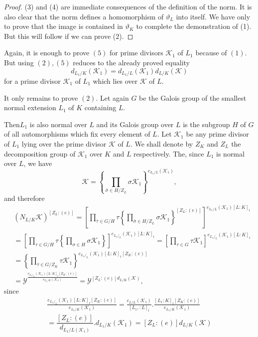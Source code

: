 \begin{proof}
  (3) and (4) are immediate consequences of the definition of the
  norm. It is also clear that the norm defines a homomorphism of
  $\vartheta_L$ into itself. We have only to prove that the image is
  contained in $\vartheta_K$ to complete the demonstration of
  (1). But this will follow if we can prove (2). 
\end{proof}

Again, it is enough to prove $(5)$ for prime divisors $\mathscr{K}_1$
of $L_1$ because of $(1)$. But using $(2), (5)$ reduces to the already
proved equality 
$$
d_{L_1 /K}(\mathscr{K}_1) = d_{L _1/ L}(\mathscr{K}_1) d_{L/ K}(\mathscr{K})
$$
for a prime divisor $\mathscr{K}_1$ of $L_1$ which lies over
$\mathscr{K}$ of $L$. 

It only remains to prove $(2)$. Let again $G$ be the Galois group of
the smallest normal extension $L_1$ of $K$ containing $L$. 

Then\pageoriginale $L_1$ is also normal over $L$ and its Galois group over $L$ is
the subgroup $H$ of $G$ of all automorphisms which fix every element
of $L$. Let $\mathscr{K}_1$ be any prime divisor of $L_1$ lying over
the prime divisor $\mathscr{K}$ of $L$. We shall denote by $Z_K$ and
$Z_L$ the decomposition group of $\mathscr{K}_1$ over $K$ and $L$
respectively. The, since $L_1$ is normal over $L$, we have  
$$
  \mathscr{K}= \left\{ \prod_{\bar{\sigma }\in H/ Z_L} \sigma
  \mathscr{K}_1\right\}^{e_{L_1 /L}(\mathscr{K}_1)},
$$
and therefore
\begin{align*} 
  & (N_{L /K}\mathscr{K})^{[Z_L : (e)]}= \left[ \prod_{\bar{\tau} \in G/
      H} \tau \left\{ \prod_{\bar{\sigma} \in  H/Z_L}\sigma
    \mathscr{K}_1\right\}^{[Z_L : (e)]}\right]^{e_{L_1/L} (\mathscr{K_1}) [L
      : K]_i} \\
  &= \left[ \prod_{\tau \in G/ H} \tau \left\{\prod_{\sigma
      \in H} \sigma \mathscr{K}_1 \right \} \right] ^{e_{L_1/
      _L}(\mathscr{K}_1) [L : K]_i} = \left[ \prod_{\tau \in G}
    \tau \mathscr{K}_1 \right]^{{e_{L_1/ _L}(\mathscr{K}_1) [L :
        K]_i}}\\ 
  &= \left\{ \prod_{ \bar{\tau}\in G/ Z_K} \tau
  \mathscr{K}_1\right\}^{{e_{L_1/ _L}(\mathscr{K}_1) [L :
        K]_i[Z_K:(e)]}}\\ 
  & = \mathscr{Y}^{\frac{{{e_{L_1/
          _L}(\mathscr{K}_1) [L : K]_i[Z_K:(e)]}}}{e_{L_1
      /K}(\mathscr{K}_1)}} =\mathscr{Y}^{[Z_L :(e)] d_{L/
      K}(\mathscr{K})}, 
\end{align*}
since
\begin{gather*}
\frac{{{e_{L_1/ _L}(\mathscr{K}_1) [L : K]_i[Z_K:(e)]}}}{e_{L_1
    /K}(\mathscr{K}_1)} = \frac{e_{L / L}(\mathscr{K}_1)}{[L_1, :
    L]_i}. \frac{[L_1 : K]_i [Z_K : (e)]}{e_{L_1 /K}(\mathscr{K}_1)} \\
    =\dfrac{[Z_L :(e)]}{d_{L_1 /L(\mathscr{K}_1)}}. d_{L_1
     /K}(\mathscr{K}_1) = [Z_L : (e)] d_{L / K}(\mathscr{K}) 
\end{gather*}\pageoriginale\

